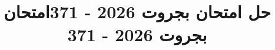 \documentclass[12pt]{article}
\title{حل امتحان بجروت 2026 - 371}
\title{امتحان بجروت 2026 - 371}
\begin{document}
\maketitle
\renewcommand{\contentsname}{جدول المحتويات}
\tableofcontents
\clearpage







\end{document}
